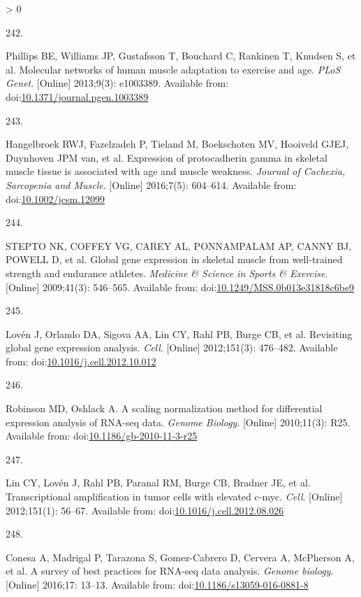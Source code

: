 \documentclass[twoside,10pt]{gihclass} %
\newlength{\cslhangindent}
\newlength{\csllabelwidth}
\newenvironment{CSLReferences}[3] %
 {%
  \setlength{\parindent}{0pt}
  \ifodd #1 \everypar{\setlength{\hangindent}{\cslhangindent}}\ignorespaces\fi
  \ifnum #2 > 0
  \setlength{\parskip}{#2\baselineskip}
  \fi
 }%
 {}
\newcommand{\CSLLeftMargin}[1]{\parbox[t]{\maxof{\widthof{#1}}{\csllabelwidth}}{#1}}
\newcommand{\CSLRightInline}[1]{\parbox[t]{\linewidth}{#1}}
\begin{document}
\begin{CSLReferences}{0}{0}
\leavevmode\hypertarget{ref-RN753}{}%
\CSLLeftMargin{242. }
\CSLRightInline{Phillips BE, Williams JP, Gustafsson T, Bouchard C, Rankinen T, Knudsen S, et al. Molecular networks of human muscle adaptation to exercise and age. \emph{PLoS Genet}. {[}Online{]} 2013;9(3): e1003389. Available from: doi:\href{https://doi.org/10.1371/journal.pgen.1003389}{10.1371/journal.pgen.1003389}}

\leavevmode\hypertarget{ref-RN2402}{}%
\CSLLeftMargin{243. }
\CSLRightInline{Hangelbroek RWJ, Fazelzadeh P, Tieland M, Boekschoten MV, Hooiveld GJEJ, Duynhoven JPM van, et al. Expression of protocadherin gamma in skeletal muscle tissue is associated with age and muscle weakness. \emph{Journal of Cachexia, Sarcopenia and Muscle}. {[}Online{]} 2016;7(5): 604--614. Available from: doi:\href{https://doi.org/10.1002/jcsm.12099}{10.1002/jcsm.12099}}

\leavevmode\hypertarget{ref-RN2398}{}%
\CSLLeftMargin{244. }
\CSLRightInline{STEPTO NK, COFFEY VG, CAREY AL, PONNAMPALAM AP, CANNY BJ, POWELL D, et al. Global gene expression in skeletal muscle from well-trained strength and endurance athletes. \emph{Medicine \& Science in Sports \& Exercise}. {[}Online{]} 2009;41(3): 546--565. Available from: doi:\href{https://doi.org/10.1249/MSS.0b013e31818c6be9}{10.1249/MSS.0b013e31818c6be9}}

\leavevmode\hypertarget{ref-RN2359}{}%
\CSLLeftMargin{245. }
\CSLRightInline{Lovén J, Orlando DA, Sigova AA, Lin CY, Rahl PB, Burge CB, et al. Revisiting global gene expression analysis. \emph{Cell}. {[}Online{]} 2012;151(3): 476--482. Available from: doi:\href{https://doi.org/10.1016/j.cell.2012.10.012}{10.1016/j.cell.2012.10.012}}

\leavevmode\hypertarget{ref-RN2414}{}%
\CSLLeftMargin{246. }
\CSLRightInline{Robinson MD, Oshlack A. A scaling normalization method for differential expression analysis of RNA-seq data. \emph{Genome Biology}. {[}Online{]} 2010;11(3): R25. Available from: doi:\href{https://doi.org/10.1186/gb-2010-11-3-r25}{10.1186/gb-2010-11-3-r25}}

\leavevmode\hypertarget{ref-RN2430}{}%
\CSLLeftMargin{247. }
\CSLRightInline{Lin CY, Lovén J, Rahl PB, Paranal RM, Burge CB, Bradner JE, et al. Transcriptional amplification in tumor cells with elevated c-myc. \emph{Cell}. {[}Online{]} 2012;151(1): 56--67. Available from: doi:\href{https://doi.org/10.1016/j.cell.2012.08.026}{10.1016/j.cell.2012.08.026}}

\leavevmode\hypertarget{ref-RN2426}{}%
\CSLLeftMargin{248. }
\CSLRightInline{Conesa A, Madrigal P, Tarazona S, Gomez-Cabrero D, Cervera A, McPherson A, et al. A survey of best practices for RNA-seq data analysis. \emph{Genome biology}. {[}Online{]} 2016;17: 13--13. Available from: doi:\href{https://doi.org/10.1186/s13059-016-0881-8}{10.1186/s13059-016-0881-8}}


\end{CSLReferences}
\end{document}
